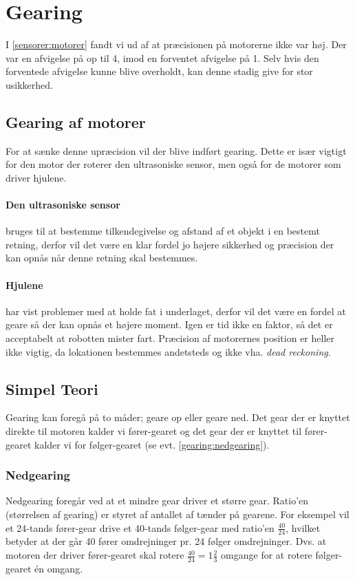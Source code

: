 \section{Gearing}
I \cref{sensorer:motorer} fandt vi ud af at præcisionen på motorerne ikke var høj.
Der var en afvigelse på op til 4\dg, imod en forventet afvigelse på 1\dg.
Selv hvis den forventede afvigelse kunne blive overholdt, kan denne stadig give for stor usikkerhed.

\subsection{Gearing af motorer}
For at sænke denne upræcision vil der blive indført gearing.
Dette er især vigtigt for den motor der roterer den ultrasoniske sensor, men også for de motorer som driver hjulene.

\paragraph{Den ultrasoniske sensor} bruges til at bestemme tilkendegivelse og afstand af et objekt i en bestemt retning, derfor vil det være en klar fordel jo højere sikkerhed og præcision der kan opnås når denne retning skal bestemmes.

\paragraph{Hjulene} har vist problemer med at holde fat i underlaget, derfor vil det være en fordel at geare så der kan opnås et højere moment.
Igen er tid ikke en faktor, så det er acceptabelt at robotten mister fart.
Præcision af motorernes position er heller ikke vigtig, da lokationen bestemmes andetsteds og ikke vha. \textit{dead reckoning}.

\subsection{Simpel Teori}
Gearing kan foregå på to måder; geare op eller geare ned.
Det gear der er knyttet direkte til motoren kalder vi fører-gearet og det gear der er knyttet til fører-gearet kalder vi for følger-gearet (se evt. \cref{gearing:nedgearing}).

\subsubsection{Nedgearing}
Nedgearing foregår ved at et mindre gear driver et større gear.
Ratio'en (størrelsen af gearing) er styret af antallet af tænder på gearene.
For eksempel vil et 24-tands fører-gear drive et 40-tands følger-gear med ratio'en $\frac{40}{24}$, hvilket betyder at der går 40 fører omdrejninger pr. 24 følger omdrejninger. Dvs. at motoren der driver fører-gearet skal rotere $\frac{40}{24} = 1 \frac{2}{3}$ omgange for at rotere følger-gearet én omgang.

